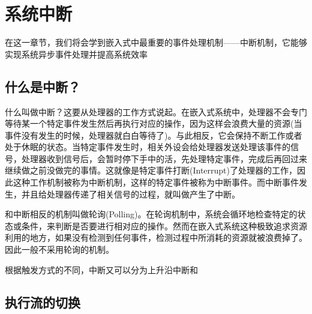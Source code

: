 \chapter{系统中断}

在这一章节，我们将会学到嵌入式中最重要的事件处理机制——中断机制，它能够实现系统异步事件处理并提高系统效率

\section{什么是中断？}
什么叫做中断？这要从处理器的工作方式说起。在嵌入式系统中，处理器不会专门等待某一个特定事件发生然后再执行对应的操作，因为这样会浪费大量的资源(当事件没有发生的时候，处理器就白白等待了)。与此相反，它会保持不断工作或者处于休眠的状态。当特定事件发生时，相关外设会给处理器发送处理该事件的信号，处理器收到信号后，会暂时停下手中的活，先处理特定事件，完成后再回过来继续做之前没做完的事情。这就像是特定事件打断(Interrupt)了处理器的工作，因此这种工作机制被称为中断机制，这样的特定事件被称为中断事件。而中断事件发生，并且给处理器传递了相关信号的过程，就叫做产生了中断。

和中断相反的机制叫做轮询(Polling)。在轮询机制中，系统会循环地检查特定的状态或条件，来判断是否要进行相对应的操作。然而在嵌入式系统这种极致追求资源利用的地方，如果没有检测到任何事件，检测过程中所消耗的资源就被浪费掉了。因此一般不采用轮询的机制。

根据触发方式的不同，中断又可以分为上升沿中断和
\section{执行流的切换}

